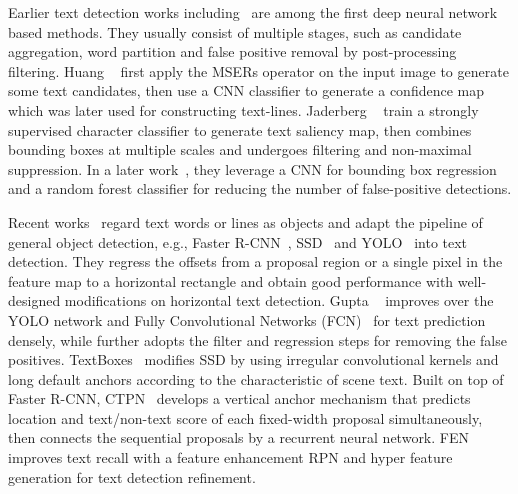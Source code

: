 \documentclass[10pt,twocolumn,letterpaper]{article}
\begin{document}
Earlier text detection works including~\cite{huang2014robust,jaderberg2014deep,jaderberg2016reading} are among the first deep neural network based methods.
They usually consist of multiple stages, such as candidate aggregation, word partition and false positive removal by post-processing filtering. Huang \etal~\cite{huang2014robust} first apply the MSERs operator on the input image to generate some text candidates, then use a CNN classifier to generate a confidence map which was later used for constructing text-lines. Jaderberg \etal~\cite{jaderberg2014deep} train a strongly supervised character classifier to generate text saliency map, then combines bounding boxes at multiple scales and undergoes filtering and non-maximal suppression. In a later work~\cite{jaderberg2016reading}, they leverage a CNN for bounding box regression and a random forest classifier for reducing the number of false-positive detections.

Recent works~\cite{gupta2016synthetic,tian2016detecting,liao2017textboxes,zhang2018feature} regard text words or lines as objects and adapt the pipeline of general object detection, e.g., Faster R-CNN~\cite{ren2015faster}, SSD~\cite{liu2016ssd} and YOLO~\cite{redmon2016you} into text detection. They regress the offsets from a proposal region or a single pixel in the feature map to a horizontal rectangle and obtain good performance with well-designed modifications on horizontal text detection. Gupta \etal~\cite{gupta2016synthetic} improves over the YOLO network and Fully Convolutional Networks (FCN)~\cite{long2015fully} for text prediction densely, while further adopts the filter and regression steps for removing the false positives. TextBoxes~\cite{liao2017textboxes} modifies SSD by using irregular convolutional kernels and long default anchors according to the characteristic of scene text. Built on top of Faster R-CNN, CTPN~\cite{tian2016detecting} develops a vertical anchor mechanism that predicts location and text/non-text score of each fixed-width proposal simultaneously, then connects the sequential proposals by a recurrent neural network. FEN~\cite{zhang2018feature} improves text recall with a feature enhancement RPN and hyper feature generation for text detection refinement.
\end{document}

